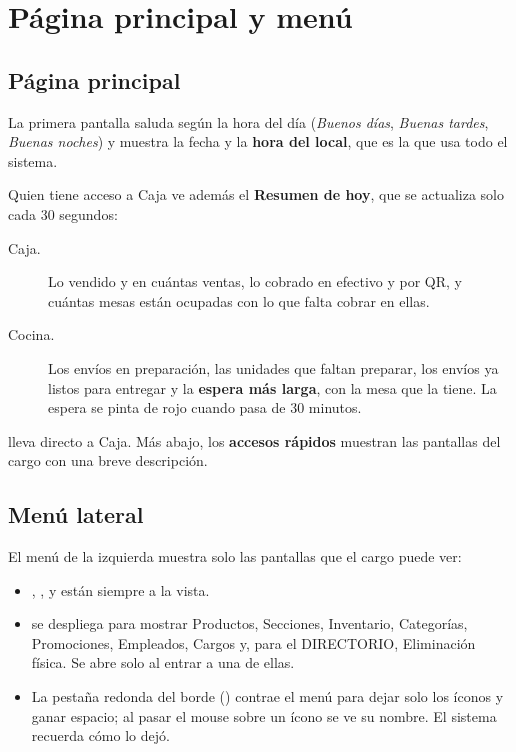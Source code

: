 \chapter{Página principal y menú}
\label{cap:inicio}

\section{Página principal}


La primera pantalla saluda según la hora del día (\textit{Buenos días}, \textit{Buenas tardes}, \textit{Buenas noches}) y muestra la fecha y la \textbf{hora del local}, que es la que usa todo el sistema.

Quien tiene acceso a Caja ve además el \textbf{Resumen de hoy}, que se actualiza solo cada 30 segundos:

\begin{description}
  \item[Caja.] Lo vendido y en cuántas ventas, lo cobrado en efectivo y por QR, y cuántas mesas están ocupadas con lo que falta cobrar en ellas.
  \item[Cocina.] Los envíos en preparación, las unidades que faltan preparar, los envíos ya listos para entregar y la \textbf{espera más larga}, con la mesa que la tiene. La espera se pinta de rojo cuando pasa de 30 minutos.
\end{description}

 lleva directo a Caja. Más abajo, los \textbf{accesos rápidos} muestran las pantallas del cargo con una breve descripción.

\section{Menú lateral}

El menú de la izquierda muestra solo las pantallas que el cargo puede ver:

\begin{itemize}
  \item {}, ,  y  están siempre a la vista.
  \item {} se despliega para mostrar Productos, Secciones, Inventario, Categorías, Promociones, Empleados, Cargos y, para el DIRECTORIO, Eliminación física. Se abre solo al entrar a una de ellas.
  \item La pestaña redonda del borde (\guillemotleft) contrae el menú para dejar solo los íconos y ganar espacio; al pasar el mouse sobre un ícono se ve su nombre. El sistema recuerda cómo lo dejó.
\end{itemize}

